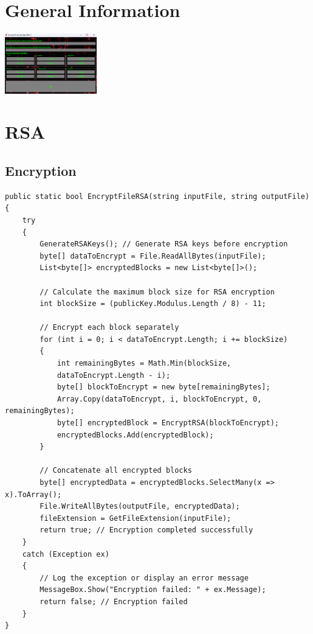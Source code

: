 \documentclass[a4paper,oneside,11pt]{book}
\begin{document}
\MakeTitle 
{} 
\tableofcontents
\pagestyle{plain}
\cleardoublepage 
{} 

\chapter[General Information]{General Information}

\includegraphics[width=0.3\textwidth]{Cryptography_Practical_Assignment_GUI.png}

\chapter[RSA]{RSA}
\section{Encryption}
\begin{lstlisting}[language=Csh, caption={Code for RSA Encryption}]
public static bool EncryptFileRSA(string inputFile, string outputFile)
{
    try
    {
        GenerateRSAKeys(); // Generate RSA keys before encryption
        byte[] dataToEncrypt = File.ReadAllBytes(inputFile);
        List<byte[]> encryptedBlocks = new List<byte[]>();
    
        // Calculate the maximum block size for RSA encryption
        int blockSize = (publicKey.Modulus.Length / 8) - 11; 
    
        // Encrypt each block separately
        for (int i = 0; i < dataToEncrypt.Length; i += blockSize)
        {
            int remainingBytes = Math.Min(blockSize, 
            dataToEncrypt.Length - i);
            byte[] blockToEncrypt = new byte[remainingBytes];
            Array.Copy(dataToEncrypt, i, blockToEncrypt, 0, remainingBytes);    
            byte[] encryptedBlock = EncryptRSA(blockToEncrypt);
            encryptedBlocks.Add(encryptedBlock);
        }
    
        // Concatenate all encrypted blocks
        byte[] encryptedData = encryptedBlocks.SelectMany(x => x).ToArray();
        File.WriteAllBytes(outputFile, encryptedData);
        fileExtension = GetFileExtension(inputFile);
        return true; // Encryption completed successfully
    }
    catch (Exception ex)
    {
        // Log the exception or display an error message
        MessageBox.Show("Encryption failed: " + ex.Message);
        return false; // Encryption failed
    }
}
\end{lstlisting}
\end{document}
